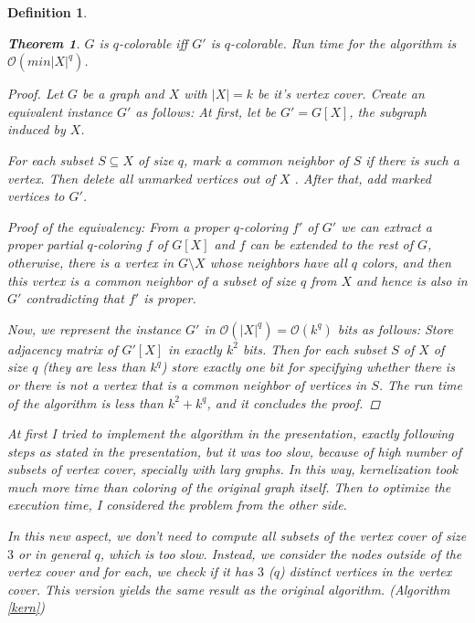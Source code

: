 \documentclass[12pt]{article}
\theoremstyle{slplain}
\newtheorem{theorem}{Theorem}
\newtheorem{defi}{Definition}
\begin{document}
\begin{defi}
\begin{theorem}{\label{main theorem}}
$G$ is $q$-colorable iff $G'$ is $q$-colorable. Run time for the algorithm
is $\mathcal{O}(min|X|^q)$.
\end{theorem}

\begin{proof}
Let $G$ be a graph and $X$ with $|X| = k$ be it's vertex cover. Create an
equivalent instance $G'$ as follows: At first, let be $G' = G[X]$,  the subgraph induced by $X$. 

For each subset
$S \subseteq X$ of size $q$, mark a common neighbor of $S$ if there is such a vertex.
Then delete all unmarked vertices out of $X$ . After that, add marked vertices to $G'$. 

Proof of the equivalency: From a proper $q$-coloring $f'$ of $G'$ we
can extract a proper partial $q$-coloring $f$ of $G[X]$ and $f$ can be extended to the rest of $G$, otherwise, there is a vertex in $G \setminus X$ whose neighbors have all $q$ colors, and then this vertex is a common neighbor of a subset of size $q$ from
$X$ and hence is also in $G'$ contradicting that $f'$ is proper.

Now, we represent the instance $G'$ in $\mathcal{O}(|X|^q) = \mathcal{O}(k^q)$ bits as follows: Store 
adjacency matrix of $G'[X]$ in exactly $k^2$ bits. Then for each subset $S$ of $X$ 
of size $q$ (they are less than $k^q$) store exactly one bit for specifying whether 
there is or there is not a vertex that is a common neighbor of vertices in $S$. The 
run time of the algorithm is less than $k^2 + k^q$, and it concludes the proof.
\end{proof}
\vspace{1cm}

At first I tried to implement the algorithm in the presentation, exactly following steps as stated in the presentation, but it was too slow, because of high number of subsets of vertex cover, specially with larg graphs. In this way, kernelization took much more time than coloring of the original graph itself. Then to optimize the execution time, I considered the problem from the other side. 

In this new aspect, we don't need to compute all subsets of the vertex cover of size $3$ or in general $q$, which is too slow. Instead, we consider the nodes outside of the vertex cover and for each, we check if it has $3$ ($q$) distinct vertices in the vertex cover. This version yields the same result as the original algorithm. (Algorithm \ref{kern})


\end{defi}
\end{document}
